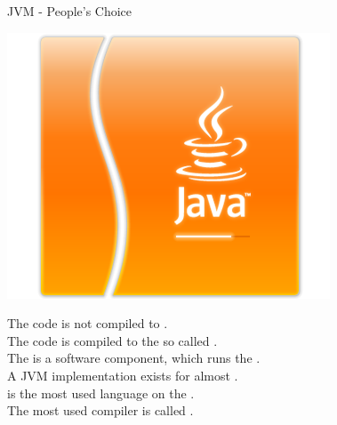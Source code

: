 \begin{frame}{JVM - People's Choice}
\begin{center}
\includegraphics[scale=0.25]{resources/JVM.png}
\end{center}
The code is \alert{not} compiled to .\\
The code is compiled to the so called .\\
The  is a software component, which runs the
.\\
A JVM implementation exists for almost .\\
 is the most used language on the .\\
The most used  compiler is called . 
\end{frame}


